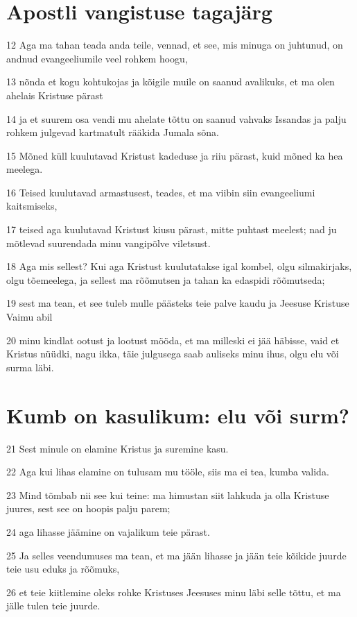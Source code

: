 \section*{Apostli vangistuse tagajärg}

\par 12 Aga ma tahan teada anda teile, vennad, et see, mis minuga on juhtunud, on andnud evangeeliumile veel rohkem hoogu,
\par 13 nõnda et kogu kohtukojas ja kõigile muile on saanud avalikuks, et ma olen ahelais Kristuse pärast
\par 14 ja et suurem osa vendi mu ahelate tõttu on saanud vahvaks Issandas ja palju rohkem julgevad kartmatult rääkida Jumala sõna.
\par 15 Mõned küll kuulutavad Kristust kadeduse ja riiu pärast, kuid mõned ka hea meelega.
\par 16 Teised kuulutavad armastusest, teades, et ma viibin siin evangeeliumi kaitsmiseks,
\par 17 teised aga kuulutavad Kristust kiusu pärast, mitte puhtast meelest; nad ju mõtlevad suurendada minu vangipõlve viletsust.
\par 18 Aga mis sellest? Kui aga Kristust kuulutatakse igal kombel, olgu silmakirjaks, olgu tõemeelega, ja sellest ma rõõmutsen ja tahan ka edaspidi rõõmutseda;
\par 19 sest ma tean, et see tuleb mulle päästeks teie palve kaudu ja Jeesuse Kristuse Vaimu abil
\par 20 minu kindlat ootust ja lootust mööda, et ma milleski ei jää häbisse, vaid et Kristus nüüdki, nagu ikka, täie julgusega saab auliseks minu ihus, olgu elu või surma läbi.

\section*{Kumb on kasulikum: elu või surm?}

\par 21 Sest minule on elamine Kristus ja suremine kasu.
\par 22 Aga kui lihas elamine on tulusam mu tööle, siis ma ei tea, kumba valida.
\par 23 Mind tõmbab nii see kui teine: ma himustan siit lahkuda ja olla Kristuse juures, sest see on hoopis palju parem;
\par 24 aga lihasse jäämine on vajalikum teie pärast.
\par 25 Ja selles veendumuses ma tean, et ma jään lihasse ja jään teie kõikide juurde teie usu eduks ja rõõmuks,
\par 26 et teie kiitlemine oleks rohke Kristuses Jeesuses minu läbi selle tõttu, et ma jälle tulen teie juurde.

